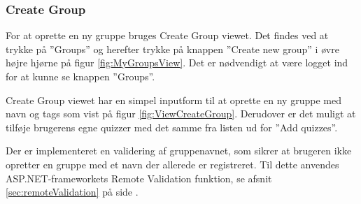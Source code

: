 \subsubsection{Create Group}
For at oprette en ny gruppe bruges Create Group viewet. Det findes ved at trykke på ''Groups'' og herefter trykke på knappen ''Create new group'' i øvre højre hjørne på figur \ref{fig:MyGroupsView}. Det er nødvendigt at være logget ind for at kunne se knappen ''Groups''.

Create Group viewet har en simpel inputform til at oprette en ny gruppe med navn og tags som vist på figur \ref{fig:ViewCreateGroup}. Derudover er det muligt at tilføje brugerens egne quizzer med det samme fra listen ud for ''Add quizzes''.

Der er implementeret en validering af gruppenavnet, som sikrer at brugeren ikke opretter en gruppe med et navn der allerede er registreret. Til dette anvendes ASP.NET-frameworkets Remote Validation funktion, se afsnit \ref{sec:remoteValidation} på side \pageref{sec:remoteValidation}.

